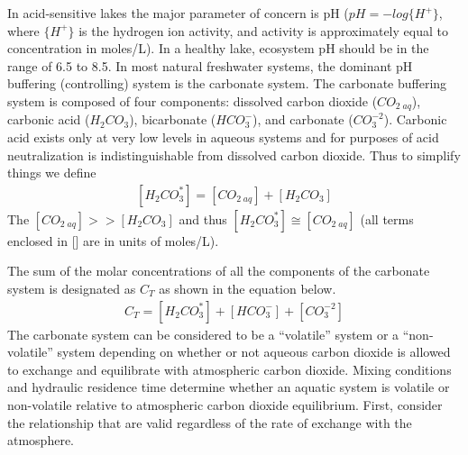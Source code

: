 \documentclass[letterpaper,10pt,english]{sphinxmanual}
\begin{document}
In acid-sensitive lakes the major parameter of concern is pH (\(pH = -log{\{H^+\}}\), where \(\{H^+\}\) is the hydrogen ion activity, and activity is approximately equal to concentration in moles/L). In a healthy lake, ecosystem pH should be in the range of 6.5 to 8.5. In most natural freshwater systems, the dominant pH buffering (controlling) system is the carbonate system. The carbonate buffering system is composed of four components: dissolved carbon dioxide (\({CO}_{{2\; aq}}\)), carbonic acid (\({H}_{{2}} {CO}_{{3}}\)), bicarbonate (\({HCO}_{{3}}^{{-}}\)), and carbonate (\({CO}_{{3}}^{{-2}}\)). Carbonic acid exists only at very low levels in aqueous systems and for purposes of acid neutralization is indistinguishable from dissolved carbon dioxide. Thus to simplify things we define
\begin{equation}\label{equation:Acid_Rain/Acid_Rain:eq_total_carbonic}
\begin{split} \left[{H}_{{2}} {CO}_{{3}}^{{*}} \right]=\left[{CO}_{{2\; aq}} \right]+\left[{H}_{{2}} {CO}_{{3}} \right]\end{split}
\end{equation}
The \(\left[{CO}_{{2\; aq}} \right] \mathrm{>} \mathrm{>} \left[{H}_{{2}} {CO}_{{3}} \right]\) and thus \(\left[{H}_{{2}} {CO}_{{3}}^{{*}} \right]\cong \left[{CO}_{{2\; aq}} \right]\) (all terms enclosed in {[}{]} are in units of moles/L).

The sum of the molar concentrations of all the components of the carbonate system is designated as \(C_T\) as shown in the equation below.
\begin{equation}\label{equation:Acid_Rain/Acid_Rain:Acid_Rain/Acid_Rain:0}
\begin{split}C_T = \left[H_2{CO}_3^* \right] + \left[{HCO}_3^- \right]+\left[{CO}_3^{-2} \right]\end{split}
\end{equation}
The carbonate system can be considered to be a “volatile” system or a “non-volatile” system depending on whether or not aqueous carbon dioxide is allowed to exchange and equilibrate with atmospheric carbon dioxide. Mixing conditions and hydraulic residence time determine whether an aquatic system is volatile or non-volatile relative to atmospheric carbon dioxide equilibrium. First, consider the relationship that are valid regardless of the rate of exchange with the atmosphere.
\end{document}
